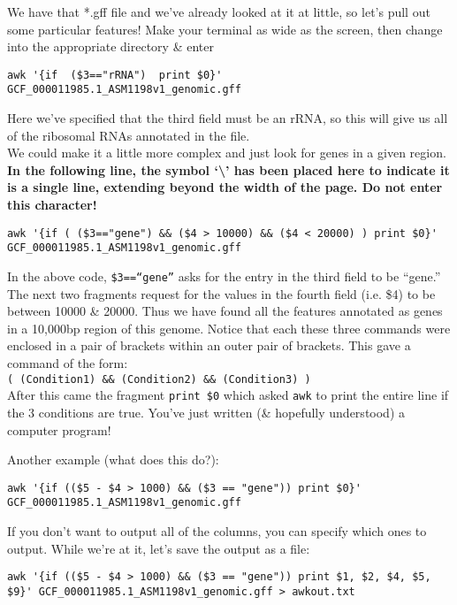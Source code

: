 \begin{steps}
We have that *.gff file and we've already looked at it at little, so let's pull out some particular features!
Make your terminal as wide as the screen, then change into the appropriate directory \& enter
\begin{lstlisting}
awk '{if  ($3=="rRNA")  print $0}' GCF_000011985.1_ASM1198v1_genomic.gff
\end{lstlisting}
Here we've specified that the third field must be an rRNA, so this will give us all of the ribosomal RNAs annotated in the file. \\

We could make it a little more complex and just look for genes in a given region.
\textbf{In the following line, the symbol `\textbackslash ' has been placed here to indicate it is a single line, extending beyond the width of the page.
Do not enter this character!}
\begin{lstlisting}
awk '{if ( ($3=="gene") && ($4 > 10000) && ($4 < 20000) ) print $0}' GCF_000011985.1_ASM1198v1_genomic.gff
\end{lstlisting}
\end{steps}
\begin{note}
In the above code, \texttt{\$3==``gene''} asks for the entry in the third field to be ``gene.''
The next two fragments request for the values in the fourth field (i.e. \$4) to be between 10000 \& 20000.
Thus we have found all the features annotated as genes in a 10,000bp region of this genome.
Notice that each these three commands were enclosed in a pair of brackets within an outer pair of brackets.
This gave a command of the form: \\
\texttt{( (Condition1) \&\& (Condition2) \&\& (Condition3) )} \\
After this came the fragment \texttt{print \$0} which asked \texttt{awk} to print the entire line if the 3 conditions are true.
You've just written (\& hopefully understood) a computer program!
\end{note}

\begin{steps}
Another example (what does this do?): \\
\begin{lstlisting}
awk '{if (($5 - $4 > 1000) && ($3 == "gene")) print $0}' GCF_000011985.1_ASM1198v1_genomic.gff 
\end{lstlisting}
If you don't want to output all of the columns, you can specify which ones to output.  
While we're at it, let's save the output as a file: \\
\begin{lstlisting}
awk '{if (($5 - $4 > 1000) && ($3 == "gene")) print $1, $2, $4, $5, $9}' GCF_000011985.1_ASM1198v1_genomic.gff > awkout.txt
\end{lstlisting}
\end{steps}

